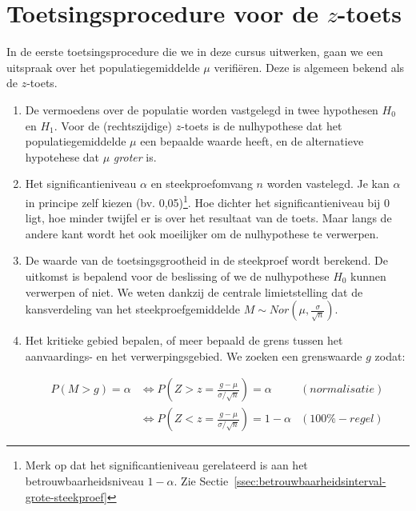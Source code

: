 \section{Toetsingsprocedure voor de \texorpdfstring{$z$}{z}-toets}
\label{sec:toetsingsprocedure-z-toets}

In de eerste toetsingsprocedure die we in deze cursus uitwerken, gaan we een uitspraak over het populatiegemiddelde $\mu$ verifiëren. Deze is algemeen bekend als de $z$-toets.

\begin{enumerate}
  \item De vermoedens over de populatie worden vastgelegd in twee hypothesen $H_{0}$ en $H_{1}$. Voor de (rechtszijdige) $z$-toets is de nulhypothese dat het populatiegemiddelde $\mu$ een bepaalde waarde heeft, en de alternatieve hypotehese dat $\mu$ \emph{groter} is.
  \item Het significantieniveau $\alpha$ en steekproefomvang $n$ worden vastelegd. Je kan $\alpha$ in principe zelf kiezen (bv. 0,05)\footnote{Merk op dat het significantieniveau gerelateerd is aan het betrouwbaarheidsniveau $1-\alpha$. Zie Sectie~\ref{ssec:betrouwbaarheidsinterval-grote-steekproef}}. Hoe dichter het significantieniveau bij 0 ligt, hoe minder twijfel er is over het resultaat van de toets. Maar langs de andere kant wordt het ook moeilijker om de nulhypothese te verwerpen.
  \item De waarde van de toetsingsgrootheid in de steekproef wordt berekend. De uitkomst is bepalend voor de beslissing of we de nulhypothese $H_{0}$ kunnen verwerpen of niet. We weten dankzij de centrale limietstelling dat de kansverdeling van het steekproefgemiddelde $M \sim Nor( \mu, \frac{\sigma}{\sqrt{n}})$.
  \item Het kritieke gebied bepalen, of meer bepaald de grens tussen het aanvaardings- en het verwerpingsgebied. We zoeken een grenswaarde $g$ zodat:
  
  \begin{equation}
  \begin{split}
  P(M > g) = \alpha & \Leftrightarrow P\left(Z> z=\frac{g-\mu}{\sigma/\sqrt{n}}\right) = \alpha & (normalisatie)\\
  & \Leftrightarrow P\left(Z < z = \frac{g-\mu}{\sigma/\sqrt{n}}\right) = 1-\alpha & (100\%-regel)
  \end{split}
  \end{equation}
  

\end{enumerate}
